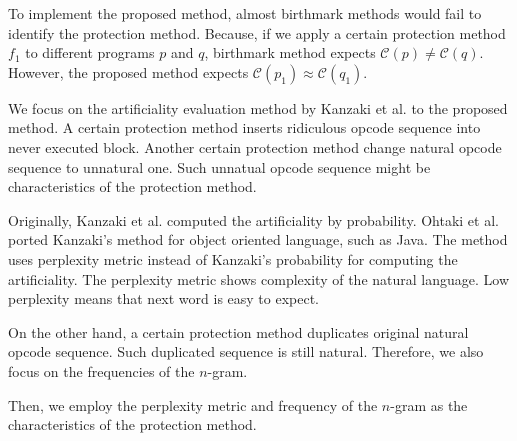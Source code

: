 \documentclass[conference]{IEEEtran}
\newcommand{\birth}[1]{\mathcal{C}(#1)}
\begin{document}
To implement the proposed method, almost birthmark methods would fail
to identify the protection method.  Because, if we apply a certain
protection method $f_1$ to different programs $p$ and $q$, birthmark
method expects $\birth{p} \neq \birth{q}$.  However, the proposed
method expects $\birth{p_1} \approx \birth{q_1}$.

We focus on the artificiality evaluation method by Kanzaki et al. to
the proposed method.  A certain protection method inserts ridiculous
opcode sequence into never executed block.  Another certain protection
method change natural opcode sequence to unnatural one.  Such unnatual
opcode sequence might be characteristics of the protection method.

Originally, Kanzaki et al. computed the artificiality by probability.
Ohtaki et al. ported Kanzaki's method for object oriented language,
such as Java\cite{gekka14scis}.  The method uses perplexity metric
instead of Kanzaki's probability for computing the artificiality.  The
perplexity metric shows complexity of the natural language.  Low
perplexity means that next word is easy to expect.

On the other hand, a certain protection method duplicates original
natural opcode sequence.  Such duplicated sequence is still natural.
Therefore, we also focus on the frequencies of the $n$-gram.

Then, we employ the perplexity metric and frequency of the $n$-gram as
the characteristics of the protection method.
\end{document}

